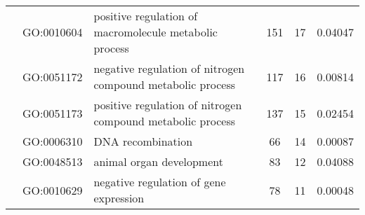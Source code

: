 \documentclass[../main.tex]{subfiles}
\begin{document}
\begin{landscape}
\begin{longtable}{@{}lllccr@{}}
		                                               & GO:0010604                         & positive regulation of macromolecule metabolic process                    & 151                                                                & 17                                                                   & 0.04047                                                                                  \\
		                                               & GO:0051172                         & negative regulation of nitrogen compound metabolic process                & 117                                                                & 16                                                                   & 0.00814                                                                                  \\
		                                               & GO:0051173                         & positive regulation of nitrogen compound metabolic process                & 137                                                                & 15                                                                   & 0.02454                                                                                  \\
		                                               & GO:0006310                         & DNA recombination                                                         & 66                                                                 & 14                                                                   & 0.00087                                                                                  \\
		                                               & GO:0048513                         & animal organ development                                                  & 83                                                                 & 12                                                                   & 0.04088                                                                                  \\
		                                               & GO:0010629                         & negative regulation of gene expression                                    & 78                                                                 & 11                                                                   & 0.00048                                                                                  \\

\end{longtable}
\end{landscape}
\end{document}
